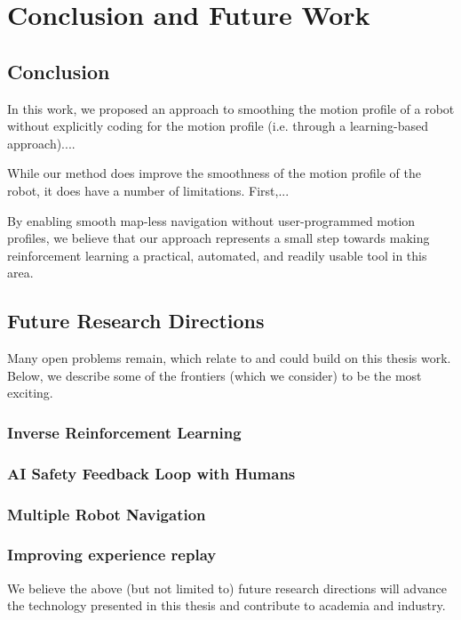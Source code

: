 \chapter{Conclusion and Future Work}
\label{ch:concl}

\section{Conclusion}

In this work, we proposed an approach to smoothing the motion profile of a robot without explicitly coding for the motion profile (i.e. through a learning-based approach)....

While our method does improve the smoothness of the motion profile of the robot, it does have a number of limitations. First,... 

By enabling smooth map-less navigation without user-programmed motion profiles, we believe that our approach represents a small step towards making reinforcement learning a practical, automated, and readily usable tool in this area. 

\section{Future Research Directions}
Many open problems remain, which relate to and could build on this thesis work. Below, we describe some of the frontiers (which we consider) to be the most exciting.

\subsection{Inverse Reinforcement Learning}

\lipsum[5]

\subsection{AI Safety Feedback Loop with Humans}

\lipsum[6]

\subsection{Multiple Robot Navigation}

\lipsum[6]

\subsection{Improving experience replay}

\lipsum[6]

\vspace{2em}
We believe the above (but not limited to) future research directions will advance the technology presented in this thesis and contribute to academia and industry.
